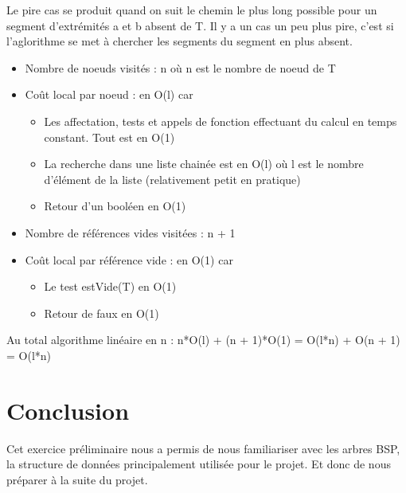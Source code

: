 \documentclass[a4paper,12pt]{report}	%
\renewcommand{\appendixpagename}{Annexes}	%
\begin{document}
\noindent Le pire cas se produit quand on suit le chemin le plus long possible pour un segment d'extrémités a et b absent de T. Il y a un cas un peu plus pire, c'est si l'aglorithme se met à chercher les segments du segment en plus absent.
\begin{itemize}
\item Nombre de noeuds visités : n où n est le nombre de noeud de T
\item Coût local par noeud : en O(l) car
\begin{itemize}
\item Les affectation, tests et appels de fonction effectuant du calcul en temps constant. Tout est en O(1)
\item La recherche dans une liste chainée est en O(l) où l est le nombre d'élément de la liste (relativement petit en pratique)
\item Retour d'un booléen en O(1)
\end{itemize}
\item Nombre de références vides visitées : n + 1
\item Coût local par référence vide : en O(1) car
\begin{itemize}
\item Le test estVide(T) en O(1)
\item Retour de faux en O(1)
\end{itemize}
\end{itemize}
Au total algorithme linéaire en n : n*O(l) + (n + 1)*O(1) = O(l*n) + O(n + 1) = O(l*n)
			
	{\section*{Conclusion}}
	
\noindent Cet exercice préliminaire nous a permis de nous familiariser avec les arbres BSP, la structure de données principalement utilisée pour le projet. Et donc de nous préparer à la suite du projet.

	
	
	
		


	
	\printbibliography
\end{document}
